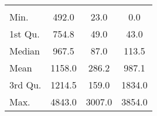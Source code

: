 \begin{tabular}{lS[table-format=5.1]S[table-format=5.1]S[table-format=5.1]}
&  &  &  \\
 Min.    & 492.0 & 23.0 & 0.0 \\
 1st Qu. & 754.8 & 49.0 & 43.0 \\
 Median  & 967.5 & 87.0 & 113.5 \\
 Mean    & 1158.0 & 286.2 & 987.1 \\
 3rd Qu. & 1214.5 & 159.0 & 1834.0 \\
 Max.    & 4843.0 & 3007.0 & 3854.0 \\
\end{tabular}
